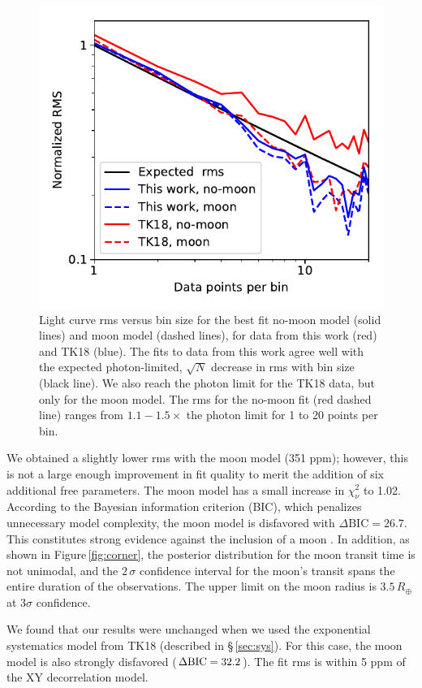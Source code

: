 \documentclass[twocolumn]{aastex62}
\begin{document}
\begin{figure}
\includegraphics[width = 0.5 \textwidth]{figures/fig2_rms.pdf}
    \caption{Light curve rms versus bin size for the best fit no-moon model (solid lines) and moon model (dashed lines), for data from this work (red) and TK18 (blue). The fits to data from this work agree well with the expected photon-limited, $\sqrt{N}$ decrease in rms with bin size (black line).  We also reach the photon limit for the TK18 data, but only for the moon model. The rms for the no-moon fit (red dashed line) ranges from $1.1 - 1.5\times$ the photon limit for 1 to 20 points per bin.}
 \label{fig:rms}
\end{figure}

We obtained a slightly lower rms with the moon model (351 ppm); however, this is not a large enough improvement in fit quality to merit the addition of six additional free parameters.  The moon model has a small increase in $\chi^2_\nu$ to 1.02. According to the Bayesian information criterion (BIC), which penalizes unnecessary model complexity, the moon model is disfavored with $\Delta\mathrm{BIC} = 26.7$. This constitutes strong evidence against the inclusion of a moon \citep{kass95}.  In addition, as shown in Figure\,\ref{fig:corner}, the posterior distribution for the moon transit time is not unimodal, and the $2\,\sigma$ confidence interval for the moon's transit spans the entire duration of the observations.  The upper limit on the moon radius is $3.5\,R_\oplus$ at $3\sigma$ confidence.


We found that our results were unchanged when we used the exponential systematics model from TK18 (described in \S\,\ref{sec:sys}). For this case, the moon model is also strongly disfavored ($\Delta\rm{BIC} = 32.2$). The fit rms is within 5 ppm of the XY decorrelation model. 
\end{document}
